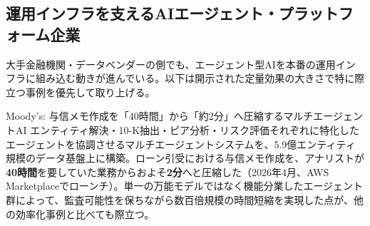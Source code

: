 \subsection{運用インフラを支えるAIエージェント・プラットフォーム企業}

大手金融機関・データベンダーの側でも、エージェント型AIを本番の運用インフラに組み込む動きが進んでいる。以下は開示された定量効果の大きさで特に際立つ事例を優先して取り上げる。

\begin{casestudy}{Moody's: 与信メモ作成を「40時間」から「約2分」へ圧縮するマルチエージェントAI}
エンティティ解決・10-K抽出・ピア分析・リスク評価それぞれに特化したエージェントを協調させるマルチエージェントシステムを、5.9億エンティティ規模のデータ基盤上に構築。ローン引受における与信メモ作成を、アナリストが\textbf{40時間}を要していた業務からおよそ\textbf{2分}へと圧縮した（2026年4月、AWS Marketplaceでローンチ）。単一の万能モデルではなく機能分業したエージェント群によって、監査可能性を保ちながら数百倍規模の時間短縮を実現した点が、他の効率化事例と比べても際立つ\cite{moodys2026creditmemo}。
\end{casestudy}

